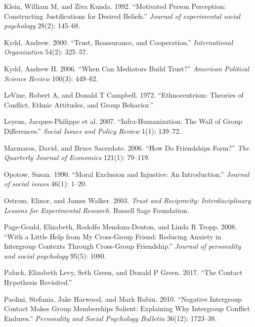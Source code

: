 \documentclass[11pt]{article}
\begin{document}
\leavevmode\hypertarget{ref-klein1992motivated}{}%
Klein, William M, and Ziva Kunda. 1992. ``Motivated Person Perception:
Constructing Justifications for Desired Beliefs.'' \emph{Journal of
experimental social psychology} 28(2): 145--68.

\leavevmode\hypertarget{ref-kydd2000trust}{}%
Kydd, Andrew. 2000. ``Trust, Reassurance, and Cooperation.''
\emph{International Organization} 54(2): 325--57.

\leavevmode\hypertarget{ref-kydd2006can}{}%
Kydd, Andrew H. 2006. ``When Can Mediators Build Trust?'' \emph{American
Political Science Review} 100(3): 449--62.

\leavevmode\hypertarget{ref-levine1972ethnocentrism}{}%
LeVine, Robert A, and Donald T Campbell. 1972. ``Ethnocentrism: Theories
of Conflict, Ethnic Attitudes, and Group Behavior.''

\leavevmode\hypertarget{ref-leyens2007infra}{}%
Leyens, Jacques-Philippe et al. 2007. ``Infra-Humanization: The Wall of
Group Differences.'' \emph{Social Issues and Policy Review} 1(1):
139--72.

\leavevmode\hypertarget{ref-marmaros2006friendships}{}%
Marmaros, David, and Bruce Sacerdote. 2006. ``How Do Friendships Form?''
\emph{The Quarterly Journal of Economics} 121(1): 79--119.

\leavevmode\hypertarget{ref-opotow1990moral}{}%
Opotow, Susan. 1990. ``Moral Exclusion and Injustice: An Introduction.''
\emph{Journal of social issues} 46(1): 1--20.

\leavevmode\hypertarget{ref-ostrom2003trust}{}%
Ostrom, Elinor, and James Walker. 2003. \emph{Trust and Reciprocity:
Interdisciplinary Lessons for Experimental Research}. Russell Sage
Foundation.

\leavevmode\hypertarget{ref-page2008little}{}%
Page-Gould, Elizabeth, Rodolfo Mendoza-Denton, and Linda R Tropp. 2008.
``With a Little Help from My Cross-Group Friend: Reducing Anxiety in
Intergroup Contexts Through Cross-Group Friendship.'' \emph{Journal of
personality and social psychology} 95(5): 1080.

\leavevmode\hypertarget{ref-paluck2017contact}{}%
Paluck, Elizabeth Levy, Seth Green, and Donald P Green. 2017. ``The
Contact Hypothesis Revisited.''

\leavevmode\hypertarget{ref-paolini2010negative}{}%
Paolini, Stefania, Jake Harwood, and Mark Rubin. 2010. ``Negative
Intergroup Contact Makes Group Memberships Salient: Explaining Why
Intergroup Conflict Endures.'' \emph{Personality and Social Psychology
Bulletin} 36(12): 1723--38.
\end{document}

